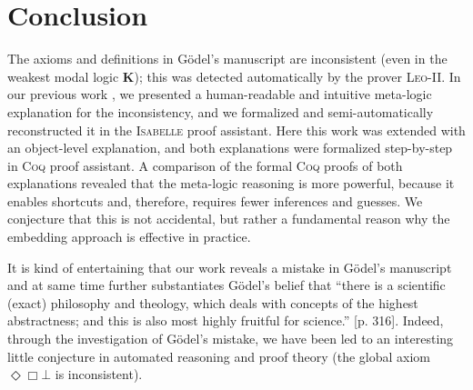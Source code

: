 \documentclass{llncs}
\newcommand{\logic}[1]{\textbf{#1}\xspace}
\newcommand{\K}{\logic{K}}
\newcommand{\Dia}{\Diamond} %
\newcommand{\nec}{\Box}
\newcommand{\pos}{\Dia}
\begin{document}
\section{Conclusion}\label{sec:conclusion}


The axioms and definitions in G\"odel's manuscript are inconsistent (even in the weakest modal logic \K);
this was detected automatically by the prover
\textsc{Leo-II}. In our previous work \cite{C55}, we presented a human-readable and intuitive meta-logic explanation for the inconsistency, and we formalized and semi-automatically reconstructed it in the \textsc{Isabelle} proof assistant. Here this work was extended with an object-level explanation, and both explanations were formalized step-by-step in \textsc{Coq} proof assistant. A comparison of the formal \textsc{Coq} proofs of both explanations revealed that the meta-logic reasoning is more powerful, because it enables shortcuts and, therefore, requires fewer inferences and guesses. We conjecture that this is not accidental, but rather a fundamental reason why the embedding approach is effective in practice. 

It is kind of entertaining that our work reveals a mistake in
G\"odel's manuscript and at same time further substantiates G\"odel's
belief that ``there is a scientific (exact) philosophy and theology,
which deals with concepts of the highest abstractness; and this is
also most highly fruitful for science.''
\cite{Wang1996}[p. 316]. Indeed, through the investigation of
G\"odel's mistake, we have been led to an interesting little
conjecture in automated reasoning and proof theory (the global axiom
$\pos \nec \bot$ is inconsistent).





\end{document}
